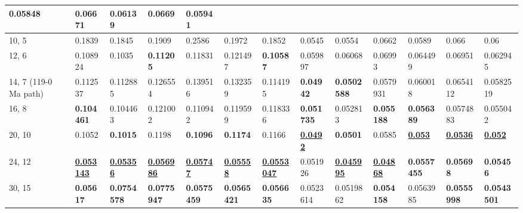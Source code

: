 \begin{table*}
{\begin{tabular}{|l|l|l|l|l|l|l|l|l|l|l|l|l|}
  0.05848 & 0.06671 & 0.06139 & 0.0669 & 0.05941 \\ \hline
10, 5 & 0.1839 & 0.1845 & 0.1909 & 0.2586 & 0.1972 & 0.1852 &
  0.0545 & 0.0554 & 0.0662 & 0.0589 & 0.066 & 0.06 \\ \hline
12, 6 & 0.108924 & 0.1035 & {\color[HTML]{34FF34} \textbf{0.11205}} & 0.11831 &
  0.121497 & {\color[HTML]{34FF34} \textbf{0.10587}} & 0.059897 & 0.06068 &
  0.06993 & 0.064499 & 0.06951 & 0.062945 \\ \hline
14, 7 (119-0 Ma path) & 0.112537 & 0.112885 & 0.126554 & 0.139516 &
  0.132359 & 0.114195 & {\color[HTML]{32CB00} \textbf{0.04942}} & {\color[HTML]{34FF34} \textbf{0.0502588}} & 0.0579931 & 0.060018 & 0.0654112 & 0.0582519 \\ \hline
16, 8 & {\color[HTML]{34FF34} \textbf{0.104461}} & 0.104463 & 0.121002 &
  0.110942 & 0.119599 & 0.118336 & {\color[HTML]{34FF34} \textbf{0.051735}} &
  0.052813 & {\color[HTML]{34FF34} \textbf{0.055188}} & {\color[HTML]{34FF34} \textbf{0.056389}} & 0.0574883 & 0.055042 \\ \hline
20, 10 & 0.1052 & {\color[HTML]{34FF34} \textbf{0.1015}} & 0.1198 &
  {\color[HTML]{34FF34} \textbf{0.1096}} & {\color[HTML]{34FF34}
  \textbf{0.1174}} & 0.1166 & {\color[HTML]{009901} {\ul \textbf{0.0492}}} &
  {\color[HTML]{32CB00} \textbf{0.0501}} & 0.0585 & {\color[HTML]{009901} {\ul
  \textbf{0.053}}} & {\color[HTML]{009901} {\ul \textbf{0.0536}}} & {\color[HTML]{009901} {\ul \textbf{0.052}}} \\ \hline
24, 12 & {\color[HTML]{009901} {\ul \textbf{0.053143}}} & {\color[HTML]{009901}
  {\ul \textbf{0.05356}}} & {\color[HTML]{009901} {\ul \textbf{0.056986}}} &
  {\color[HTML]{009901} {\ul \textbf{0.05747}}} & {\color[HTML]{009901} {\ul
  \textbf{0.05558}}} & {\color[HTML]{009901} {\ul \textbf{0.0553047}}} &
  0.051926 & {\color[HTML]{009901} {\ul \textbf{0.045995}}} & {\color[HTML]{009901} {\ul \textbf{0.04868}}} &
  {\color[HTML]{32CB00} \textbf{0.0557455}} & {\color[HTML]{34FF34} \textbf{0.05698}} & {\color[HTML]{34FF34} \textbf{0.05456}} \\ \hline
30, 15 & {\color[HTML]{32CB00} \textbf{0.05617}} & {\color[HTML]{32CB00}
  \textbf{0.0754578}} & {\color[HTML]{32CB00} \textbf{0.0775947}} &
  {\color[HTML]{32CB00} \textbf{0.0575459}} & {\color[HTML]{32CB00}
  \textbf{0.0565421}} & {\color[HTML]{32CB00} \textbf{0.056635}} & 0.0523614 &
  0.0519862 & {\color[HTML]{32CB00} \textbf{0.054158}} & 0.0563985 &
  {\color[HTML]{32CB00} \textbf{0.0555998}} & {\color[HTML]{32CB00} \textbf{0.0543501}} \\ \hline

\end{tabular}}
\end{table*}
